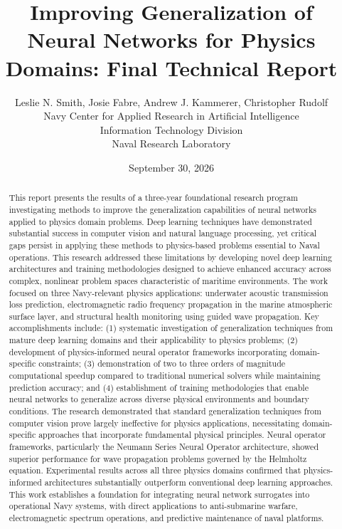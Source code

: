 \documentclass{article}
\begin{document}
\title{Improving Generalization of Neural Networks for Physics Domains: Final Technical Report}

\author{Leslie N. Smith, Josie Fabre, Andrew J. Kammerer, Christopher Rudolf\\
Navy Center for Applied Research in Artificial Intelligence\\
Information Technology Division\\
Naval Research Laboratory}

\date{September 30, 2026}

\maketitle

\begin{abstract}
This report presents the results of a three-year foundational research program investigating methods to improve the generalization capabilities of neural networks applied to physics domain problems. Deep learning techniques have demonstrated substantial success in computer vision and natural language processing, yet critical gaps persist in applying these methods to physics-based problems essential to Naval operations. This research addressed these limitations by developing novel deep learning architectures and training methodologies designed to achieve enhanced accuracy across complex, nonlinear problem spaces characteristic of maritime environments. The work focused on three Navy-relevant physics applications: underwater acoustic transmission loss prediction, electromagnetic radio frequency propagation in the marine atmospheric surface layer, and structural health monitoring using guided wave propagation. Key accomplishments include: (1) systematic investigation of generalization techniques from mature deep learning domains and their applicability to physics problems; (2) development of physics-informed neural operator frameworks incorporating domain-specific constraints; (3) demonstration of two to three orders of magnitude computational speedup compared to traditional numerical solvers while maintaining prediction accuracy; and (4) establishment of training methodologies that enable neural networks to generalize across diverse physical environments and boundary conditions. The research demonstrated that standard generalization techniques from computer vision prove largely ineffective for physics applications, necessitating domain-specific approaches that incorporate fundamental physical principles. Neural operator frameworks, particularly the Neumann Series Neural Operator architecture, showed superior performance for wave propagation problems governed by the Helmholtz equation. Experimental results across all three physics domains confirmed that physics-informed architectures substantially outperform conventional deep learning approaches. This work establishes a foundation for integrating neural network surrogates into operational Navy systems, with direct applications to anti-submarine warfare, electromagnetic spectrum operations, and predictive maintenance of naval platforms.
\end{abstract}
\end{document}
